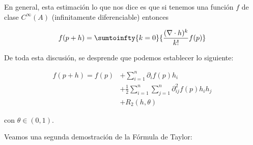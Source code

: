 En general, esta estimación lo que nos dice es que si tenemos una función $f$ de clase $C^{\infty}(A)$ (infinitamente diferenciable) entonces

\[
f(p + h) = \sumtoinfty{k=0}{\dfrac{(\nabla \cdot h)^k}{k!}f(p)}
\]

De toda esta discusión, se desprende que podemos establecer lo siguiente:

\begin{align*}
    f(p + h) = f(p) &+ \sum_{i=1}^n \partial_i f(p) h_i \\
        &+ \frac{1}{2} \sum_{i=1}^n \sum_{j=1}^n \partial_{ij}^2 f(p) h_ih_j \\
        &+ R_2(h, \theta)
\end{align*}

\noindent con $\theta \in (0,1)$.

Veamos una segunda demostración de la Fórmula de Taylor:


